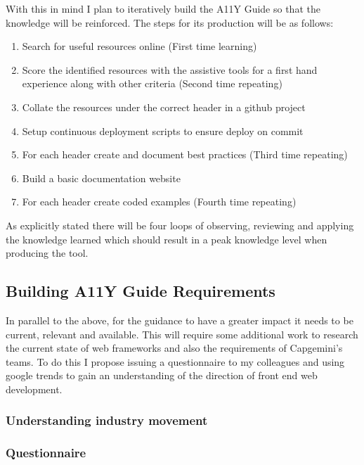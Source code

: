 With this in mind I plan to iteratively build the A11Y Guide so
that the knowledge will be reinforced. The steps for its production will be
as follows:
\begin{enumerate}
  \item Search for useful resources online (First time learning)
  \item Score the identified resources with the assistive tools for a first hand
  experience along with other criteria (Second time repeating)
  \item Collate the resources under the correct header in a github project
  \item Setup continuous deployment scripts to ensure deploy on commit
  \item For each header create and document best practices (Third time
  repeating)
  \item Build a basic documentation website
  \item For each header create coded examples (Fourth time repeating)
\end{enumerate}

As explicitly stated there will be four loops of observing, reviewing and
applying the knowledge learned which should result in a peak knowledge level
when producing the tool.

\subsection{Building A11Y Guide Requirements}
In parallel to the above, for the guidance to have a greater impact it
needs to be current, relevant and available. This will require some additional
work to research the current state of web frameworks and also the
requirements of Capgemini's teams. To do this I propose issuing a
questionnaire to my colleagues and using google trends to gain an
understanding of the direction
of front end web development.

\subsubsection{Understanding industry movement}

\subsubsection{Questionnaire}

